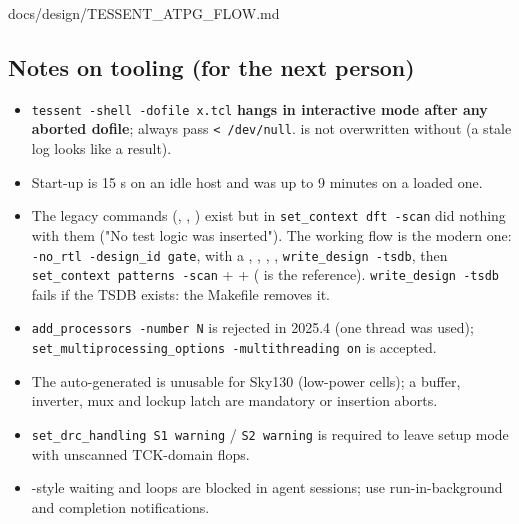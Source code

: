 \begin{relocated}{docs/design/TESSENT_ATPG_FLOW.md}
{}

\subsection{Notes on tooling (for the next person)}\label{tm:flow:tessent-atpg:8-notes-on-tooling-for-the-next-person}

\begin{itemize}
\tightlist
\item
  \texttt{tessent\ -\allowbreak{}shell\ -\allowbreak{}dofile\ x.\allowbreak{}tcl}
  \textbf{hangs in interactive mode after any aborted dofile}; always
  pass \texttt{<\ /\allowbreak{}dev/\allowbreak{}null}. 
  is not overwritten without  (a stale log looks like a
  result).
\item
  Start-up is 15 s on an idle host and was up to 9 minutes on a loaded
  one.
\item
  The  legacy commands (,
  , ) exist but 
  in \texttt{set\_\allowbreak{}context\ dft\ -\allowbreak{}scan} did
  nothing with them ("No test logic was inserted"). The working flow is
  the modern one:
  \texttt{-\allowbreak{}no\_\allowbreak{}rtl\ -\allowbreak{}design\_\allowbreak{}id\ gate},
   with a ,
  , ,
  ,
  \texttt{write\_\allowbreak{}design\ -\allowbreak{}tsdb}, then
  \texttt{set\_\allowbreak{}context\ patterns\ -\allowbreak{}scan} +
   + 
  (
   is the reference).
  \texttt{write\_\allowbreak{}design\ -\allowbreak{}tsdb} fails if the
  TSDB exists: the Makefile removes it.
\item
  \texttt{add\_\allowbreak{}processors\ -\allowbreak{}number\ N} is
  rejected in 2025.4 (one thread was used);
  \texttt{set\_\allowbreak{}multiprocessing\_\allowbreak{}options\ -\allowbreak{}multithreading\ on}
  is accepted.
\item
  The auto-generated  is unusable for Sky130
  (low-power cells); a buffer, inverter, mux and lockup latch are
  mandatory or insertion aborts.
\item
  \texttt{set\_\allowbreak{}drc\_\allowbreak{}handling\ S1\ warning} /
  \texttt{S2\ warning} is required to leave setup mode with unscanned
  TCK-domain flops.
\item
  -style waiting and  loops are blocked in agent
  sessions; use run-in-background and completion notifications.
\end{itemize}


\end{relocated}
